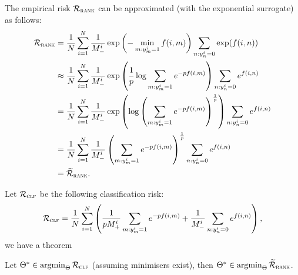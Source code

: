 The empirical risk $\mathcal{R}_\textsc{rank}$ can be approximated (with the exponential surrogate) as follows:
\begin{equation*}
\begin{aligned}
\mathcal{R}_\textsc{rank} 
&= \frac{1}{N} \sum_{i=1}^N \frac{1}{M_-^i} \exp \left( -\min_{m: y_m^i = 1} f(i, m) \right) \sum_{n: y_n^i = 0} \exp(f(i, n)) \\
&\approx \frac{1}{N} \sum_{i=1}^N \frac{1}{M_-^i} \exp \left( \frac{1}{p} \log\sum_{m: y_m^i = 1} e^{-p f(i, m)} \right)
         \sum_{n: y_n^i = 0} e^{f(i, n)} \\
&= \frac{1}{N} \sum_{i=1}^N \frac{1}{M_-^i} \exp \left( \log \left( \sum_{m: y_m^i = 1} e^{-p f(i, m)} \right)^\frac{1}{p} \right) 
   \sum_{n: y_n^i = 0} e^{f(i, n)} \\
&= \frac{1}{N} \sum_{i=1}^N \frac{1}{M_-^i} \left( \sum_{m: y_m^i = 1} e^{-p f(i, m)} \right)^\frac{1}{p} \sum_{n: y_n^i = 0} e^{f(i, n)} \\
&= \widetilde{\mathcal{R}}_\textsc{rank}.
\end{aligned}
\end{equation*}

Let $\mathcal{R}_\textsc{clf}$ be the following classification risk:
\begin{equation*}
\mathcal{R}_\textsc{clf} 
= \frac{1}{N} \sum_{i=1}^N \left( 
  \frac{1}{p M_+^i} \sum_{m: y_m^i = 1} e^{-p f(i, m)} 
  + \frac{1}{M_-^i} \sum_{n: y_n^i = 0} e^{f(i, n)} \right),
\end{equation*}
we have a theorem
\begin{theorem}
\label{th:rank2clf}
Let $\Theta^* \in \operatorname*{argmin}_{\Theta} \mathcal{R}_\textsc{clf}$ (assuming minimisers exist), 
then $\Theta^* \in \operatorname*{argmin}_{\Theta} \widetilde{\mathcal{R}}_\textsc{rank}$.
\end{theorem}

